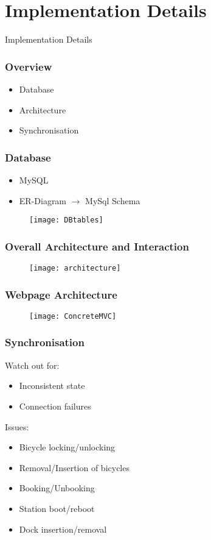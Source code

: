 \section{Implementation Details}
\begin{frame}
	\begin{center}
		\Huge Implementation Details
	\end{center}
\end{frame}
\begin{frame}
\frametitle{Overview}
\begin{itemize}
\item Database
\item Architecture
\item Synchronisation
\end{itemize}
\end{frame}

\begin{frame}
\frametitle{Database}
\begin{itemize}
	\item MySQL
	\item ER-Diagram $\rightarrow$ MySql Schema
\end{itemize}
	\begin{figure}
		\texttt{[image: DBtables]}
	\end{figure}
\end{frame}


\begin{frame}
	\frametitle{Overall Architecture and Interaction}
		\begin{figure}
		\centering
			\texttt{[image: architecture]}
		\end{figure}
\end{frame}

\begin{frame}
	\frametitle{Webpage Architecture}
	\begin{figure}
	\centering
		\texttt{[image: ConcreteMVC]}
	\end{figure}
\end{frame}

\begin{frame}
	\frametitle{Synchronisation}
	Watch out for:
	\begin{itemize}
		\item Inconsistent state
		\item Connection failures
	\end{itemize}
	\pause
	Issues:
	\begin{itemize}
		\item Bicycle locking/unlocking
		\item Removal/Insertion of bicycles
		\item Booking/Unbooking
		\item Station boot/reboot
		\item Dock insertion/removal
	\end{itemize}
\end{frame}